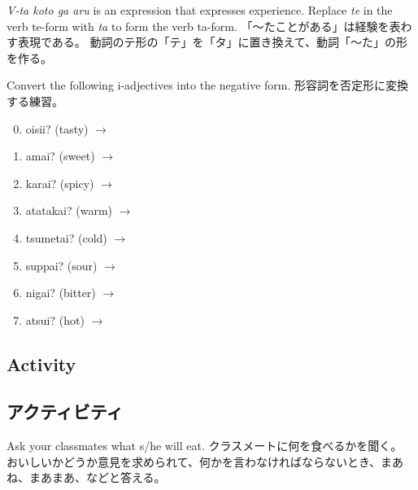 \documentclass[uplatex,dvipdfmx,b5paper,english,10pt]{jsbook}
\begin{document}
\begin{toianswer}
\ifEnglish
{\it V-ta koto ga aru\/} is an expression that expresses experience.
Replace {\it te\/} in the verb te-form with {\it ta\/} to form the verb ta-form.
\else
「～たことがある」は経験を表わす表現である。
動詞のテ形の「テ」を「タ」に置き換えて、動詞「～た」の形を作る。
\fi
\end{toianswer}

\begin{toiquestion}
\ifEnglish
Convert the following i-adjectives into the negative form.
\else
形容詞を否定形に変換する練習。
\fi
\end{toiquestion}

\begin{multicols}{2}
 \begin{enumerate}
  \setcounter{enumi}{-1}
  \item oisii? (tasty)   $\rightarrow$ \hrulefill
  \item amai? (sweet)    $\rightarrow$ \hrulefill
  \item karai? (spicy)   $\rightarrow$ \hrulefill
  \item atatakai? (warm) $\rightarrow$ \hrulefill
  \item tsumetai? (cold) $\rightarrow$ \hrulefill
  \item suppai? (sour)   $\rightarrow$ \hrulefill
  \item nigai? (bitter)  $\rightarrow$ \hrulefill
  \item atsui? (hot)     $\rightarrow$ \hrulefill
 \end{enumerate}
\end{multicols}


\ifEnglish
\subsection{Activity}
\else
\subsection{アクティビティ}
\fi

\begin{toiquestion}
\ifEnglish
Ask your classmates what s/he will eat.
\else
クラスメートに何を食べるかを聞く。
おいしいかどうか意見を求められて、何かを言わなければならないとき、まあね、まあまあ、などと答える。
\fi
\end{toiquestion}
\end{document}
